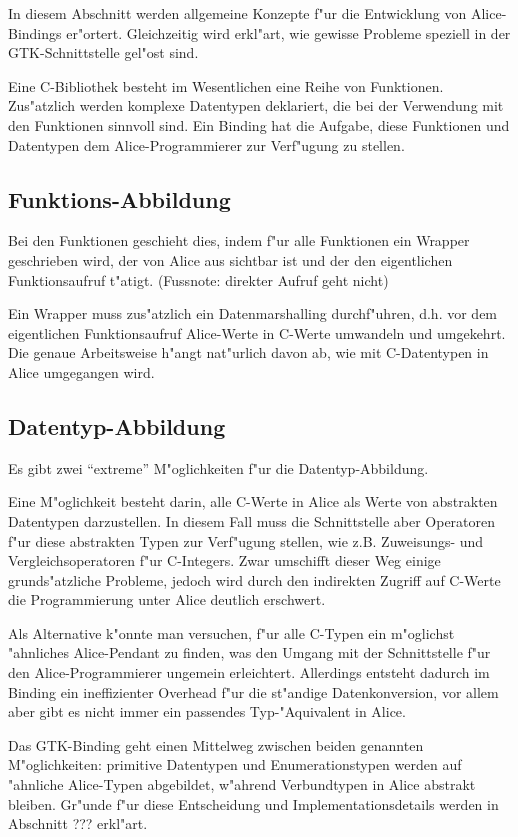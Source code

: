 \documentclass{article}
\begin{document}
In diesem Abschnitt werden allgemeine Konzepte f"ur die Entwicklung von
Alice-Bindings er"ortert. Gleichzeitig wird erkl"art,
wie gewisse Probleme speziell in der GTK-Schnittstelle gel"ost sind.

Eine C-Bibliothek besteht im Wesentlichen eine Reihe von Funktionen.
Zus"atzlich werden komplexe Datentypen deklariert, die bei der Verwendung
mit den Funktionen sinnvoll sind. Ein Binding hat die Aufgabe, diese
Funktionen und Datentypen dem Alice-Programmierer zur Verf"ugung zu stellen.

\subsection{Funktions-Abbildung}

Bei den Funktionen geschieht dies, indem f"ur alle Funktionen ein Wrapper
geschrieben wird, der von Alice aus sichtbar ist und der den eigentlichen
Funktionsaufruf t"atigt. (Fussnote: direkter Aufruf geht nicht)

Ein Wrapper muss zus"atzlich ein Datenmarshalling durchf"uhren, d.h. vor
dem eigentlichen Funktionsaufruf Alice-Werte in C-Werte umwandeln und
umgekehrt. Die genaue Arbeitsweise h"angt nat"urlich davon ab, wie mit
C-Datentypen in Alice umgegangen wird.

\subsection{Datentyp-Abbildung}

Es gibt zwei ``extreme'' M"oglichkeiten f"ur die Datentyp-Abbildung.

Eine M"oglichkeit besteht darin, alle C-Werte in Alice als Werte von abstrakten
Datentypen darzustellen. In diesem Fall muss die Schnittstelle aber Operatoren
f"ur diese abstrakten Typen zur Verf"ugung stellen, wie z.B. Zuweisungs- und
Vergleichsoperatoren f"ur C-Integers.
Zwar umschifft dieser Weg einige grunds"atzliche Probleme,
jedoch wird durch den indirekten Zugriff auf C-Werte die Programmierung
unter Alice deutlich erschwert.

Als Alternative k"onnte man versuchen, f"ur alle C-Typen ein m"oglichst
"ahnliches Alice-Pendant zu finden, was den Umgang mit der Schnittstelle
f"ur den Alice-Programmierer ungemein erleichtert. Allerdings entsteht
dadurch im Binding ein ineffizienter Overhead f"ur die st"andige
Datenkonversion, vor allem aber gibt es nicht immer
ein passendes Typ-"Aquivalent in Alice.

Das GTK-Binding geht einen Mittelweg zwischen beiden genannten M"oglichkeiten:
primitive Datentypen und Enumerationstypen werden auf "ahnliche Alice-Typen
abgebildet, w"ahrend Verbundtypen in Alice abstrakt bleiben.
Gr"unde f"ur diese Entscheidung und Implementationsdetails werden in Abschnitt
??? erkl"art.
\end{document}
